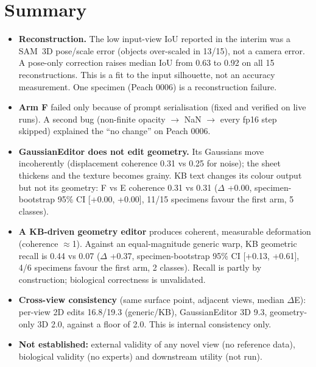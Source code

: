 \section*{Summary}
\begin{itemize}
\item \textbf{Reconstruction.} The low input-view IoU reported in the interim was a SAM~3D pose/scale error (objects over-scaled in 13/15), not a camera error. A pose-only correction raises median IoU from 0.63 to 0.92 on all 15 reconstructions. This is a fit to the input silhouette, not an accuracy measurement. One specimen (Peach 0006) is a reconstruction failure.
\item \textbf{Arm F} failed only because of prompt serialisation (fixed and verified on live runs). A second bug (non-finite opacity $\rightarrow$ NaN $\rightarrow$ every fp16 step skipped) explained the ``no change'' on Peach 0006.
\item \textbf{GaussianEditor does not edit geometry.} Its Gaussians move incoherently (displacement coherence 0.31 vs 0.25 for noise); the sheet thickens and the texture becomes grainy. KB text changes its colour output but not its geometry: F vs E coherence 0.31 vs 0.31 ($\Delta$ +0.00, specimen-bootstrap 95\% CI [+0.00, +0.00], 11/15 specimens favour the first arm, 5 classes).
\item \textbf{A KB-driven geometry editor} produces coherent, measurable deformation (coherence $\approx$1). Against an equal-magnitude generic warp, KB geometric recall is 0.44 vs 0.07 ($\Delta$ +0.37, specimen-bootstrap 95\% CI [+0.13, +0.61], 4/6 specimens favour the first arm, 2 classes). Recall is partly by construction; biological correctness is unvalidated.
\item \textbf{Cross-view consistency} (same surface point, adjacent views, median $\Delta$E): per-view 2D edits 16.8/19.3 (generic/KB), GaussianEditor 3D 9.3, geometry-only 3D 2.0, against a floor of 2.0. This is internal consistency only.
\item \textbf{Not established:} external validity of any novel view (no reference data), biological validity (no experts) and downstream utility (not run).
\end{itemize}
